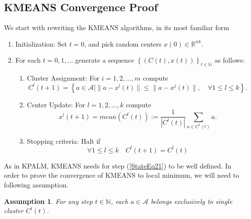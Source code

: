 \documentclass[11pt]{article}
\numberwithin{equation}{section}
\newtheorem{assumption}{Assumption}
\begin{document}
\subsection{KMEANS Convergence Proof}

We start with rewriting the KMEANS algorithms, in its most familiar form
\begin{enumerate}[(1)]
	\item Initialization: Set $t=0$, and pick random centers $x(0) \in \mathbb{R}^{nk}$.

	\item For each $t=0,1, \ldots$ generate a sequence $\left\lbrace (C(t),x(t))\right\rbrace_{t \in \mathbb{N}}$ as follows:
	\begin{enumerate}[(2.1)]
		\item Cluster Assignment: For $i=1, 2, \ldots ,m$ compute
		\begin{equation}
			C^l(t+1) = \left\lbrace a \in \mathcal{A} \mid \| a - x^l(t) \| \leq \|a - x^j(t) \|, \quad \forall 1 \leq l \leq k \right\rbrace . \label{StateEq20}
		\end{equation}
		
		\item Center Update: For $l=1, 2, \ldots ,k$ compute
		\begin{equation}
			x^l(t+1) = mean(C^l(t)) := \frac{1}{\left| C^l(t) \right|} \sum\limits_{a \in C^l(t)} a . \label{StateEq21}
		\end{equation}
		
		\item Stopping criteria: Halt if 
		\begin{equation}
			\forall 1 \leq l \leq k \quad C^l(t+1)=C^l(t) \label{StateEq22}
		\end{equation}
	\end{enumerate}
\end{enumerate}
As in KPALM, KMEANS needs  for step (\ref{StateEq21}) to be well defined. In order to prove the convergence of KMEANS to local minimum, we will need to following assumption.

\begin{assumption} \label{StateEq23}
For any step $t \in \mathbb{N}$, each $a \in \mathcal{A}$ belongs exclusively to single cluster $C^l(t)$.
\end{assumption}
\end{document}
